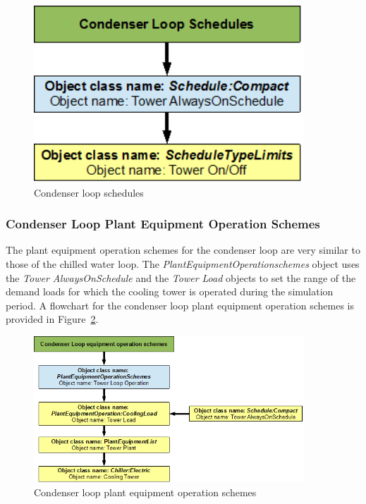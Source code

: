\begin{figure}[hbtp] %
\centering
\includegraphics[width=0.9\textwidth, height=0.9\textheight, keepaspectratio=true]{media/image037.png}
\caption{Condenser loop schedules \protect \label{fig:condenser-loop-schedules}}
\end{figure}

\subsubsection{Condenser Loop Plant Equipment Operation Schemes}\label{condenser-loop-plant-equipment-operation-schemes-001}

The plant equipment operation schemes for the condenser loop are very similar to those of the chilled water loop. The \emph{PlantEquipmentOperationschemes} object uses the \emph{Tower AlwaysOnSchedule} and the \emph{Tower Load} objects to set the range of the demand loads for which the cooling tower is operated during the simulation period. A flowchart for the condenser loop plant equipment operation schemes is provided in Figure~\ref{fig:condenser-loop-plant-equipment-operation}.

\begin{figure}[hbtp] %
\centering
\includegraphics[width=0.9\textwidth, height=0.9\textheight, keepaspectratio=true]{media/image038.png}
\caption{Condenser loop plant equipment operation schemes \protect \label{fig:condenser-loop-plant-equipment-operation}}
\end{figure}

